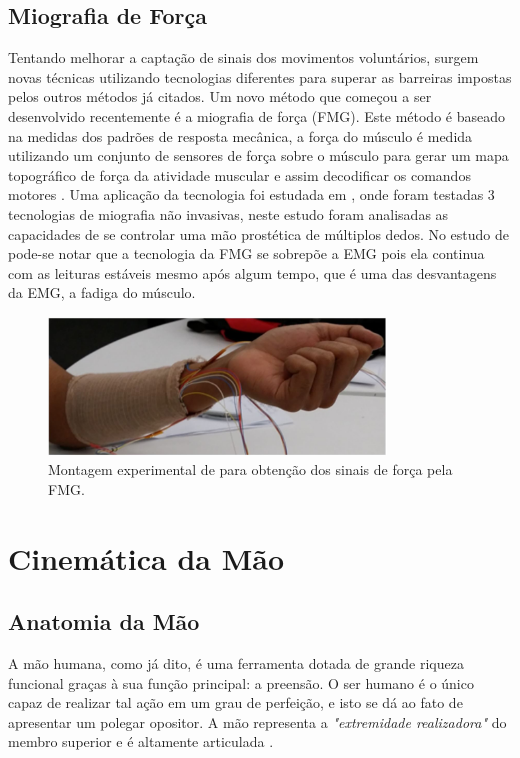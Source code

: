 \subsection{Miografia de Força}\label{cap2:sub2.5}

Tentando melhorar a captação de sinais dos movimentos voluntários, surgem novas técnicas utilizando tecnologias diferentes para superar as barreiras impostas pelos outros métodos já citados. Um novo método que começou a ser desenvolvido recentemente é a miografia de força (FMG). Este método é baseado na medidas dos padrões de resposta mecânica, a força do músculo é medida utilizando um conjunto de sensores de força sobre o músculo para gerar um mapa topográfico de força da atividade muscular e assim decodificar os comandos motores \cite{rasouli2015stable}. Uma aplicação da tecnologia foi estudada em \cite{ravindra2014comparative}, onde foram testadas 3 tecnologias de miografia não invasivas, neste estudo foram analisadas as capacidades de se controlar uma mão prostética de múltiplos dedos. No estudo de \cite{ravindra2014comparative} pode-se notar que a tecnologia da FMG se sobrepõe a EMG pois ela continua com as leituras estáveis mesmo após algum tempo, que é uma das desvantagens da EMG, a fadiga do músculo.

\begin{figure}[H]
\centering
\includegraphics[width = 0.8\textwidth]{img/Rasouli2015_FMG2.JPG}
\caption[Montagem Experimental da FMG]{Montagem experimental de \cite{rasouli2015stable} para obtenção dos sinais de força pela FMG.}
\label{Rasouli2015_FMG}
\end{figure}

\section{Cinemática da Mão}

\subsection{Anatomia da Mão}
\label{anatomia_mao}
A mão humana, como já dito, é uma ferramenta dotada de grande riqueza funcional graças à sua função principal: a preensão. O ser humano é o único capaz de realizar tal ação em um grau de perfeição, e isto se dá ao fato de apresentar um polegar opositor. A mão representa a \textit{"extremidade realizadora"} do membro superior e é altamente articulada \cite{kapandji1971physiology}. 


